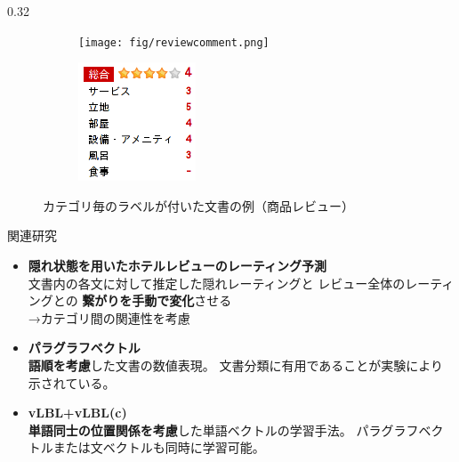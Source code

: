\documentclass[8pt,unicode]{beamer}
\newcommand{\columnscale}{0.32}
\newcommand{\itemtitle}[1]{\textbf{#1} \\}
\newcommand{\arrow}{{\color{ttiblue} →}\hspace{1ex}}
\newcommand{\good}[1]{\textbf{\color{orange} #1}}
\newcommand{\bad}[1]{\textbf{\color{blue} #1}}
\begin{document}
\begin{frame}{}
\begin{columns}[t]
\begin{column}{\columnscale\textwidth}
  \begin{figure}
    \begin{subfigure}{0.52\textwidth}
      \texttt{[image: fig/reviewcomment.png]}
    \end{subfigure}
    \begin{subfigure}{0.32\textwidth}
      \includegraphics[width=\textwidth]{fig/reviewpoints.png}
    \end{subfigure}
    \caption{カテゴリ毎のラベルが付いた文書の例（商品レビュー）}
  \end{figure}

  \begin{block}{関連研究}
    \begin{itemize}
      \item \itemtitle{隠れ状態を用いたホテルレビューのレーティング予測}
        文書内の各文に対して推定した隠れレーティングと
        レビュー全体のレーティングとの\bad{繋がりを手動で変化}させる \\
        \arrow カテゴリ間の関連性を考慮
      \item \itemtitle{パラグラフベクトル}
        \good{語順を考慮}した文書の数値表現。
        文書分類に有用であることが実験により示されている。
      \item \itemtitle{vLBL+vLBL(c)}
        \good{単語同士の位置関係を考慮}した単語ベクトルの学習手法。
        パラグラフベクトルまたは文ベクトルも同時に学習可能。
    \end{itemize}
  \end{block}


\end{column}
\end{columns}
\end{frame}
\end{document}
